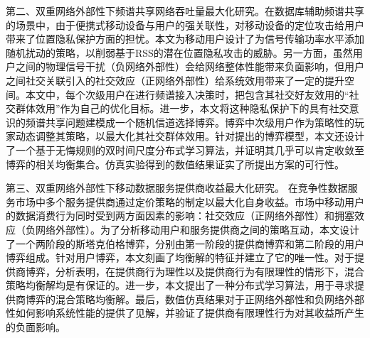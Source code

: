 第二、双重网络外部性下频谱共享网络吞吐量最大化研究。在数据库辅助频谱共享的场景中，由于便携式移动设备与用户的强关联性，对移动设备的定位攻击给用户带来了位置隐私保护方面的担忧。本文为移动用户设计了为信号传输功率水平添加随机扰动的策略，以削弱基于RSS的潜在位置隐私攻击的威胁。另一方面，虽然用户之间的物理信号干扰（{\kaishu 负网络外部性}）会给网络整体性能带来负面影响，但用户之间社交关联引入的社交效应（{\kaishu 正网络外部性}）给系统效用带来了一定的提升空间。本文中，每个次级用户在进行频谱接入决策时，把包含其社交好友效用的“社交群体效用”作为自己的优化目标。进一步，本文将这种隐私保护下的具有社交意识的频谱共享问题建模成一个随机信道选择博弈。博弈中次级用户作为策略性的玩家动态调整其策略，以最大化其社交群体效用。针对提出的博弈模型，本文还设计了一个基于无悔规则的双时间尺度分布式学习算法，并证明其几乎可以肯定收敛至博弈的相关均衡集合。仿真实验得到的数值结果证实了所提出方案的可行性。

第三、双重网络外部性下移动数据服务提供商收益最大化研究。
在竞争性数据服务市场中多个服务提供商通过定价策略的制定以最大化自身收益。市场中移动用户的数据消费行为同时受到两方面因素的影响：社交效应（{\kaishu 正网络外部性}）和拥塞效应（{\kaishu 负网络外部性}）。为了分析移动用户和服务提供商之间的策略互动，本文设计了一个两阶段的斯塔克伯格博弈，分别由第一阶段的提供商博弈和第二阶段的用户博弈组成。针对用户博弈，本文刻画了均衡解的特征并建立了它的唯一性。对于提供商博弈，分析表明，在提供商行为理性以及提供商行为有限理性的情形下，混合策略均衡解均是有保证的。进一步，本文提出了一种分布式学习算法，用于寻求提供商博弈的混合策略均衡解。最后，数值仿真结果对于正网络外部性和负网络外部性如何影响系统性能的提供了见解，并验证了提供商有限理性行为对其收益所产生的负面影响。


